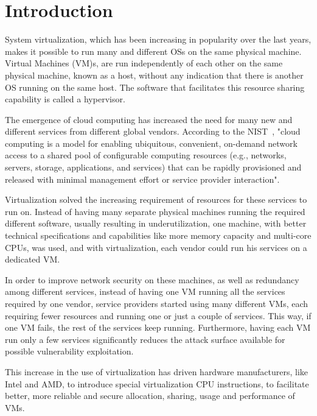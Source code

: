 \chapter{Introduction}\label{ch:intro}

System virtualization, which has been increasing in popularity over the last years, makes it possible to run many and different \acp{OS} on the same physical machine. Virtual Machines (VM)s, are run independently of each other on the same physical machine, known as a host, without any indication that there is another \ac{OS} running on the same host. The software that facilitates this resource sharing capability is called a hypervisor.

\par The emergence of cloud computing has increased the need for many new and different services from different global vendors. According to the \ac{NIST}~\cite{mell2011nist}, "cloud computing is a model for enabling ubiquitous, convenient, on-demand network access to a shared pool of configurable computing resources (e.g., networks, servers, storage, applications, and services) that can be rapidly provisioned and released with minimal management effort or service provider interaction".  

\par Virtualization solved the increasing requirement of resources for these services to run on. Instead of having many separate physical machines running the required different software, usually resulting in underutilization, one machine, with better technical specifications and capabilities like more memory capacity and multi-core \acp{CPU}, was used, and with virtualization, each vendor could run his services on a dedicated \ac{VM}. 

\par In order to improve network security on these machines, as well as redundancy among different services, instead of having one VM running all the services required by one vendor, service providers started using many different \ac{VM}s, each requiring fewer resources and running one or just a couple of services. This way, if one VM fails, the rest of the services keep running. Furthermore, having each \ac{VM} run only a few services significantly reduces the attack surface available for possible vulnerability exploitation.

\par This increase in the use of virtualization has driven hardware manufacturers, like Intel and AMD, to introduce special virtualization \ac{CPU} instructions, to facilitate better, more reliable and secure allocation, sharing, usage and performance of \ac{VM}s. 

